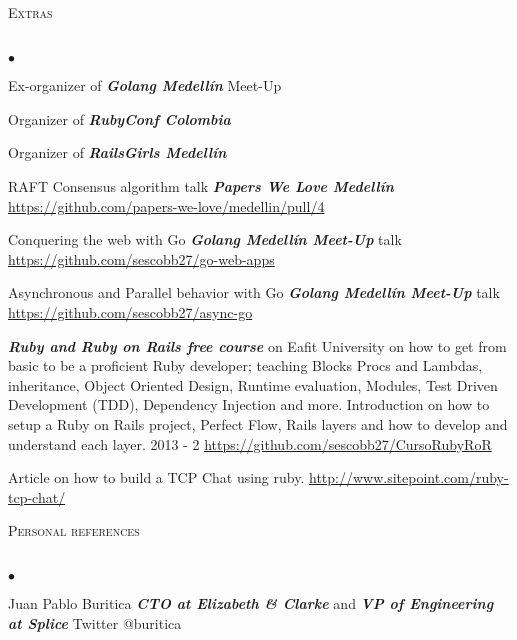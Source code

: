 \documentclass[a4paper]{article}
\newcommand{\lineunder}{\vspace*{-8pt} \\ \hspace*{-18pt} \hrulefill \\}
\newcommand{\header}[1]{{\hspace*{-15pt}\vspace*{6pt}
\textsc{#1}} \vspace*{-6pt} \lineunder}
\newcommand{\employer}[3]{{
\textbf{#1} (#2)\\ \underline{\textbf{\emph{#3}}}\\ }}
\newenvironment{achievements}{\begin{list}{$\bullet$}{\topsep 0pt \itemsep
-2pt}}{\vspace*{4pt}\end{list}}
\newcommand{\emphasys}[1]{\textbf{\emph{#1}}}
\begin{document}
\header{Extras}
\begin{achievements}
\item{Ex-organizer of \emphasys{Golang Medell\'in} Meet-Up}
\item{Organizer of \emphasys{RubyConf Colombia}}
\item{Organizer of \emphasys{RailsGirls Medell\'in}}
\item{RAFT Consensus algorithm talk \emphasys{Papers We Love Medell\'in} \url{https://github.com/papers-we-love/medellin/pull/4}}
\item{Conquering the web with Go \emphasys{Golang Medell\'in Meet-Up} talk \url{https://github.com/sescobb27/go-web-apps}}
\item{Asynchronous and Parallel behavior with Go \emphasys{Golang Medell\'in Meet-Up} talk \url{https://github.com/sescobb27/async-go}}
\item{\emphasys{Ruby and Ruby on Rails free course} on Eafit University on how to get from basic to be a proficient Ruby developer; teaching Blocks Procs and Lambdas, inheritance, Object Oriented Design, Runtime evaluation, Modules, Test Driven Development (TDD), Dependency Injection and more. Introduction on how to setup a Ruby on Rails project, Perfect Flow, Rails layers and how to develop and understand each layer. 2013 - 2 \url{https://github.com/sescobb27/CursoRubyRoR}}
\item{Article on how to build a TCP Chat using ruby. \url{http://www.sitepoint.com/ruby-tcp-chat/}}
\end{achievements}


\header{Personal references}
\begin{achievements}
\item{Juan Pablo Buritica \emphasys{CTO at Elizabeth \& Clarke} and \emphasys{VP of Engineering at Splice} Twitter @buritica}
\end{achievements}
\end{document}
